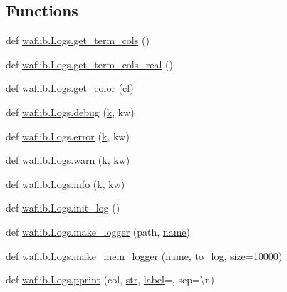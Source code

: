 \subsection*{Functions}
\begin{DoxyCompactItemize}
\item 
def \hyperlink{namespacewaflib_1_1_logs_a53026f26ec1fca7ea3115b70beb74e43}{waflib.\+Logs.\+get\+\_\+term\+\_\+cols} ()
\item 
def \hyperlink{namespacewaflib_1_1_logs_a7d3f15e7642ca6704c20f93785c258a7}{waflib.\+Logs.\+get\+\_\+term\+\_\+cols\+\_\+real} ()
\item 
def \hyperlink{namespacewaflib_1_1_logs_a6b3347689827b58479ced498128080db}{waflib.\+Logs.\+get\+\_\+color} (cl)
\item 
def \hyperlink{namespacewaflib_1_1_logs_a3f5a70f19cd606d1392a04634c591004}{waflib.\+Logs.\+debug} (\hyperlink{rfft2d_test_m_l_8m_adc468c70fb574ebd07287b38d0d0676d}{k}, kw)
\item 
def \hyperlink{namespacewaflib_1_1_logs_a8a43c07202381c093d206d015faca5c6}{waflib.\+Logs.\+error} (\hyperlink{rfft2d_test_m_l_8m_adc468c70fb574ebd07287b38d0d0676d}{k}, kw)
\item 
def \hyperlink{namespacewaflib_1_1_logs_acfc4c59a3011ba34982faddeba664944}{waflib.\+Logs.\+warn} (\hyperlink{rfft2d_test_m_l_8m_adc468c70fb574ebd07287b38d0d0676d}{k}, kw)
\item 
def \hyperlink{namespacewaflib_1_1_logs_ac9b7edb9e6c457b63ece38ca8c8e8b26}{waflib.\+Logs.\+info} (\hyperlink{rfft2d_test_m_l_8m_adc468c70fb574ebd07287b38d0d0676d}{k}, kw)
\item 
def \hyperlink{namespacewaflib_1_1_logs_a8c96ad6b70b70bfcad1cabcbd3bfb7f2}{waflib.\+Logs.\+init\+\_\+log} ()
\item 
def \hyperlink{namespacewaflib_1_1_logs_a2fd9a8aa35484b2713521360a73fd8ca}{waflib.\+Logs.\+make\+\_\+logger} (path, \hyperlink{lib_2expat_8h_a1b49b495b59f9e73205b69ad1a2965b0}{name})
\item 
def \hyperlink{namespacewaflib_1_1_logs_a1926b8bfe3fe67b05ece81eb4d7caeb2}{waflib.\+Logs.\+make\+\_\+mem\+\_\+logger} (\hyperlink{lib_2expat_8h_a1b49b495b59f9e73205b69ad1a2965b0}{name}, to\+\_\+log, \hyperlink{group__lavu__mem_ga854352f53b148adc24983a58a1866d66}{size}=10000)
\item 
def \hyperlink{namespacewaflib_1_1_logs_a70506c528cabfbae02b10e4568bfbc5d}{waflib.\+Logs.\+pprint} (col, \hyperlink{sndfile__save_8m_a4b99ff73a8a869319570237b5c57ab03}{str}, \hyperlink{_tags_8cpp_a0a3345b0d4574d7adffe113dacd8ccec}{label}=\textquotesingle{}\textquotesingle{}, sep=\textquotesingle{}\textbackslash{}n\textquotesingle{})
\end{DoxyCompactItemize}
